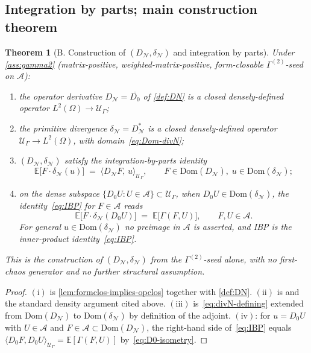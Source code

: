 \documentclass[11pt,reqno]{amsart}
\theoremstyle{plain}
\newtheorem{theorem}{Theorem}[section]
\theoremstyle{definition}
\theoremstyle{remark}
\newcommand{\E}{\mathbb{E}}
\newcommand{\Dom}{\mathrm{Dom}}
\newcommand{\cA}{\mathcal A}
\newcommand{\cN}{\mathcal N}
\newcommand{\cU}{\mathcal U}
\newcommand{\dN}{D_{\cN}}
\newcommand{\divN}{\delta_{\cN}}
\begin{document}
\subsection{Integration by parts; main construction theorem}\label{sec:IBP}

\begin{theorem}[B. Construction of $(\dN,\divN)$ and integration by parts]\label{thm:B}
Under \cref{ass:gamma2} (matrix-positive, weighted-matrix-positive, form-closable
$\Gamma^{(2)}$-seed on $\cA$):
\begin{enumerate}
\item[$(\mathrm i)$] the operator derivative
$\dN=\overline{D_{0}}$ of \cref{def:DN} is a closed
densely-defined operator $L^{2}(\Omega)\to\cU_{\Gamma}$;
\item[$(\mathrm{ii})$] the primitive divergence
$\divN=\dN^{*}$ is a closed densely-defined operator
$\cU_{\Gamma}\to L^{2}(\Omega)$, with domain~\eqref{eq:Dom-divN};
\item[$(\mathrm{iii})$] $(\dN,\divN)$ satisfy the integration-by-parts
identity
\begin{equation}\label{eq:IBP}
  \E\!\bigl[F\cdot\divN(u)\bigr]
  \;=\;\langle \dN F,\,u\rangle_{\cU_{\Gamma}},
  \qquad F\in\Dom(\dN),\;u\in\Dom(\divN);
\end{equation}
\item[$(\mathrm{iv})$] on the dense subspace
$\{D_{0}U:U\in\cA\}\subset\cU_{\Gamma}$, when
$D_{0}U\in\Dom(\divN)$, the identity~\eqref{eq:IBP} for
$F\in\cA$ reads
\begin{equation}\label{eq:IBP-on-A}
  \E\!\bigl[F\cdot\divN(D_{0}U)\bigr]
  \;=\;\E\!\bigl[\Gamma(F,U)\bigr],
  \qquad F,U\in\cA.
\end{equation}
For general $u\in\Dom(\divN)$ no preimage in $\cA$ is asserted,
and IBP is the inner-product identity~\eqref{eq:IBP}.
\end{enumerate}
This is the construction of $(\dN,\divN)$ from the
$\Gamma^{(2)}$-seed alone, with no first-chaos generator and no
further structural assumption.
\end{theorem}

\begin{proof}
$(\mathrm i)$ is \cref{lem:formclos-implies-opclos} together
with \cref{def:DN}. $(\mathrm{ii})$ is \cite[Thm.~13.9]{Rudin-FA}
and the standard density argument cited above.
$(\mathrm{iii})$ is~\eqref{eq:divN-defining} extended from
$\Dom(\dN)$ to $\Dom(\divN)$ by definition of the adjoint.
$(\mathrm{iv})$: for $u=D_{0}U$ with $U\in\cA$ and
$F\in\cA\subset\Dom(\dN)$, the right-hand side of~\eqref{eq:IBP}
equals
$\langle D_{0}F,D_{0}U\rangle_{\cU_{\Gamma}}=\E[\Gamma(F,U)]$
by~\eqref{eq:D0-isometry}.
\end{proof}
\end{document}
